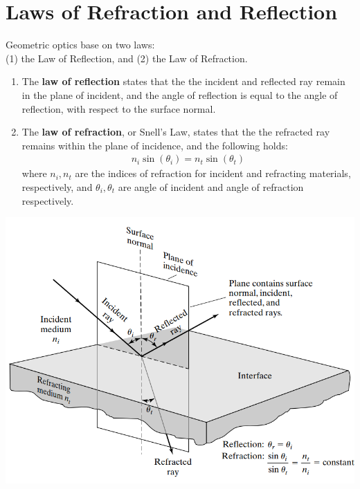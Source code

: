 \documentclass[11pt]{book}
\theoremstyle{break}
\theoremstyle{break}
\begin{document}
\section[Laws of Refraction and Reflection]{\color{red}Laws of Refraction and Reflection\color{black}}
Geometric optics base on two laws:\\
(1) the Law of Reflection, and (2) the Law of Refraction. 
\begin{enumerate}
\item The \textbf{law of reflection} states that the the incident and reflected ray remain in the plane of incident, and the angle of reflection is equal to the angle of reflection, with respect to the surface normal. 
\item The \textbf{law of refraction}, or Snell's Law, states that the the refracted ray remains within the plane of incidence, and the following holds:
\begin{align}
n_i \sin(\theta_i) = n_t \sin(\theta_t)
\end{align} 
where $n_i,n_t$ are the indices of refraction for incident and refracting materials, respectively, and $\theta_i,\theta_t$ are angle of incident and angle of refraction respectively. 
\end{enumerate}
\begin{center}
\includegraphics[scale=0.55]{Laws.png}
\end{center}
\end{document}

